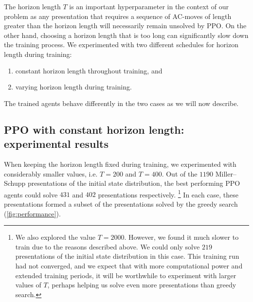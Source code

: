 The horizon length $T$ is an important hyperparameter in the context of our problem as any presentation that requires a sequence of AC-moves of length greater than the horizon length will necessarily remain unsolved by PPO. On the other hand, choosing a horizon length that is too long can significantly slow down the training process. We experimented with two different schedules for horizon length during training: 
\begin{enumerate}[label=(\roman*)]
    \item constant horizon length throughout training, and
    \item varying horizon length during training. 
\end{enumerate}

The trained agents behave differently in the two cases as we will now describe.

\subsection{PPO with constant horizon length: experimental results} When keeping the horizon length fixed during training, we experimented with considerably smaller values, i.e. $T=200$ and $T=400$. Out of the $1190$ Miller--Schupp presentations of the initial state distribution, the best performing PPO agents could solve $431$ and $402$ presentations respectively. \footnote{We also explored the value $T=2000$. However, we found it much slower to train due to the reasons described above. We could only solve $219$ presentations of the initial state distribution in this case. This training run had not converged, and we expect that with more computational power and extended training periods, it will be worthwhile to experiment with larger values of $T$, perhaps helping us solve even more presentations than greedy search.}
In each case, these presentations formed a subset of the presentations solved by the greedy search (\autoref{fig:performance}).

